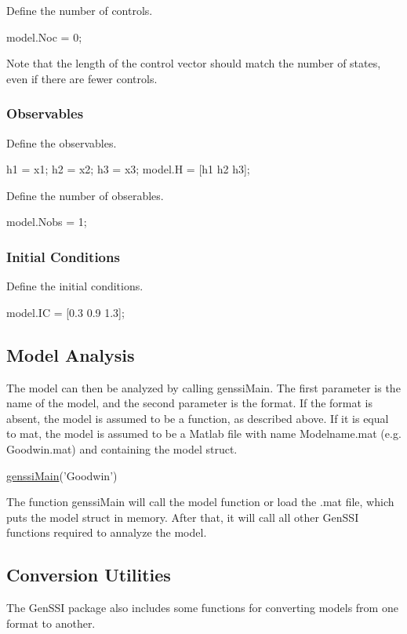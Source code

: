 Define the number of controls.


\begin{DoxyCode}
model.Noc = 0; 
\end{DoxyCode}


Note that the length of the control vector should match the number of states, even if there are fewer controls.\hypertarget{def_simu_obserables}{}\subsubsection{Observables}\label{def_simu_obserables}
Define the observables.


\begin{DoxyCode}
h1 = x1;
h2 = x2;
h3 = x3;
model.H = [h1 h2 h3];
\end{DoxyCode}


Define the number of obserables.


\begin{DoxyCode}
model.Nobs = 1; 
\end{DoxyCode}
\hypertarget{def_simu_ic}{}\subsubsection{Initial Conditions}\label{def_simu_ic}
Define the initial conditions.


\begin{DoxyCode}
model.IC = [0.3 0.9 1.3];
\end{DoxyCode}
\hypertarget{def_simu_analysis}{}\subsection{Model Analysis}\label{def_simu_analysis}
The model can then be analyzed by calling genssi\+Main. The first parameter is the name of the model, and the second parameter is the format. If the format is absent, the model is assumed to be a function, as described above. If it is equal to \textquotesingle{}mat\textquotesingle{}, the model is assumed to be a Matlab file with name Modelname.\+mat (e.\+g. Goodwin.\+mat) and containing the model struct.


\begin{DoxyCode}
\hyperlink{genssi_main_8m_aac78e2620e69e2ecf610a2526a32c7fb}{genssiMain}(\textcolor{stringliteral}{'Goodwin'})
\end{DoxyCode}


The function genssi\+Main will call the model function or load the .mat file, which puts the model struct in memory. After that, it will call all other Gen\+S\+SI functions required to annalyze the model.\hypertarget{def_simu_conversion}{}\subsection{Conversion Utilities}\label{def_simu_conversion}
The Gen\+S\+SI package also includes some functions for converting models from one format to another.


